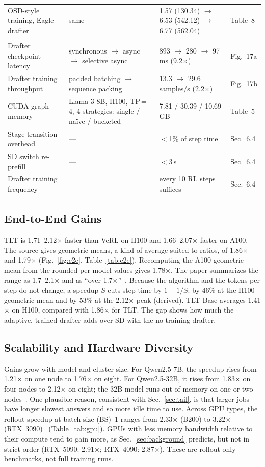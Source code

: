\documentclass[conference]{IEEEtran}
\makeatletter
\newcommand{\x}{\ensuremath{\times}}
\newcommand{\group}[2]{\rowcolor{grouphead}\multicolumn{#1}{@{}l}{\textbf{#2}}\\}
\makeatother
\begin{document}
\begin{table}[t]
\begin{tabular}{@{}L{4.0cm}L{5.6cm}L{5.6cm}L{1.3cm}@{}}
OSD-style training, Eagle drafter & same & 1.57 (130.34) $\to$ 6.53 (542.12) $\to$ 6.77 (562.04) & Table~8 \\
\group{4}{System mechanisms and overheads}
Drafter checkpoint latency & synchronous $\to$ async $\to$ selective async & 893 $\to$ 280 $\to$ 97\,ms (9.2\x) & Fig.~17a \\
Drafter training throughput & padded batching $\to$ sequence packing & 13.3 $\to$ 29.6 samples/s (2.2\x) & Fig.~17b \\
CUDA-graph memory & Llama-3-8B, H100, TP\,=\,4, 4 strategies: single / naïve / bucketed & 7.81 / 30.39 / 10.69\,GB & Table~5 \\
Stage-transition overhead & --- & $<$1\% of step time & Sec.~6.4 \\
SD switch re-prefill & --- & $<$3\,s & Sec.~6.4 \\
Drafter training frequency & --- & every 10 RL steps suffices & Sec.~6.4 \\
\bottomrule
\end{tabular}
\end{table}

\subsection{End-to-End Gains}
TLT is 1.71--2.12\x{} faster than VeRL on H100 and 1.66--2.07\x{} faster on A100. The source gives geometric means, a kind of average suited to ratios, of 1.86\x{} and 1.79\x{} (Fig.~\ref{fig:e2e}, Table~\ref{tab:e2e}). Recomputing the A100 geometric mean from the rounded per-model values gives 1.78\x. The paper summarizes the range as 1.7--2.1\x{} and as ``over 1.7\x''~\cite{hu2026tlt}. Because the algorithm and the tokens per step do not change, a speedup $S$ cuts step time by $1-1/S$: by 46\% at the H100 geometric mean and by 53\% at the 2.12\x{} peak (derived). TLT-Base averages 1.41\x{} on H100, compared with 1.86\x{} for TLT. The gap shows how much the adaptive, trained drafter adds over SD with the no-training drafter.

\subsection{Scalability and Hardware Diversity}
Gains grow with model and cluster size. For Qwen2.5-7B, the speedup rises from 1.21\x{} on one node to 1.76\x{} on eight. For Qwen2.5-32B, it rises from 1.83\x{} on four nodes to 2.12\x{} on eight; the 32B model runs out of memory on one or two nodes~\cite[Table~3]{hu2026tlt}. One plausible reason, consistent with Sec.~\ref{sec:tail}, is that larger jobs have longer slowest answers and so more idle time to use. Across GPU types, the rollout speedup at batch size (BS)~1 ranges from 2.33\x{} (B200) to 3.22\x{} (RTX~3090)~\cite[Table~2]{hu2026tlt} (Table~\ref{tab:gpu}). GPUs with less memory bandwidth relative to their compute tend to gain more, as Sec.~\ref{sec:background} predicts, but not in strict order (RTX~5090: 2.91\x; RTX~4090: 2.87\x). These are rollout-only benchmarks, not full training runs.
\end{document}
